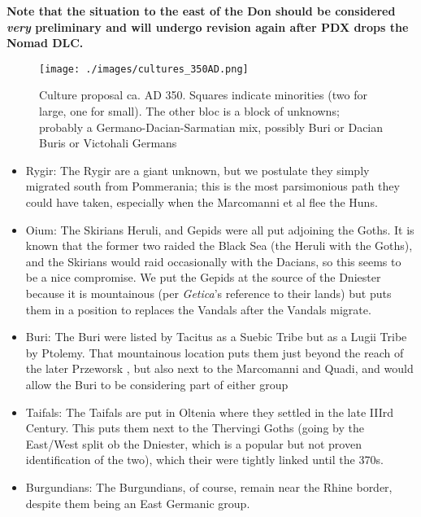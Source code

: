 \documentclass{article}
\begin{document}
	\textbf{Note that the situation to the east of the Don should be considered \textit{very} preliminary and will undergo revision again after PDX drops the Nomad DLC.}
	
	\begin{figure}[h!]
		\centering
		\texttt{[image: ./images/cultures\_350AD.png]}
		\caption{Culture proposal ca. AD 350. Squares indicate minorities (two for large, one for small).
			\newline\tiny The other bloc is a block of unknowns; probably a Germano-Dacian-Sarmatian mix, possibly Buri or Dacian Buris or Victohali Germans}
	\end{figure}
	
	\begin{itemize}
		\item Rygir:\newline
		The Rygir are a giant unknown, but we postulate they simply migrated south from Pommerania; this is the most parsimonious path they could have taken, especially when the Marcomanni et al flee the Huns.
		
		\item Oium:\newline
		The Skirians Heruli, and Gepids were all put adjoining the Goths.
		It is known that the former two raided the Black Sea (the Heruli with the Goths), and the Skirians would raid occasionally with the Dacians, so this seems to be a nice compromise.
		We put the Gepids at the source of the Dniester because it is mountainous (per \textit{Getica}'s reference to their lands) but puts them in a position to replaces the Vandals after the Vandals migrate.
		
		\item Buri:\newline
		The Buri were listed by Tacitus as a Suebic Tribe but as a Lugii Tribe by Ptolemy.
		That mountainous location puts them just beyond the reach of the later Przeworsk \cite{HeatherEmpiresAndBarbarians,PrzeworskHistory}, but also next to the Marcomanni and Quadi, and would allow the Buri to be considering part of either group
		
		\item Taifals:\newline
		The Taifals are put in Oltenia where they settled in the late IIIrd Century.
		This puts them next to the Thervingi Goths (going by the East/West split ob the Dniester, which is a popular but not proven identification of the two), which their were tightly linked until the 370s.
		\item Burgundians:\newline
		The Burgundians, of course, remain near the Rhine border, despite them being an East Germanic group.
		

\end{itemize}
\end{document}
